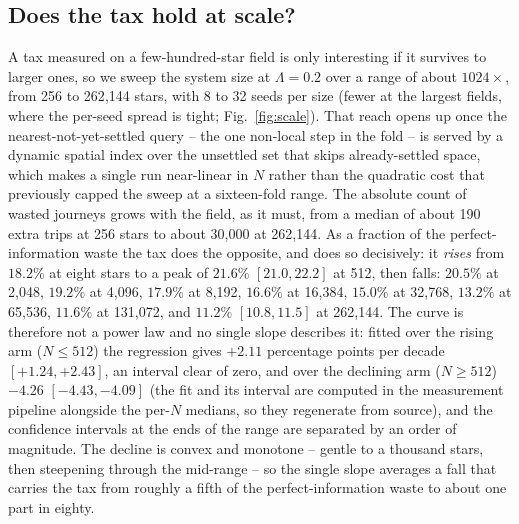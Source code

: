 \subsection{Does the tax hold at scale?}
\label{sec:scale}
A tax measured on a few-hundred-star field is only interesting if it survives to larger ones, so we
sweep the system size at $\Lambda = 0.2$ over a range of about $1024\times$, from 256 to 262{,}144
stars, with 8 to 32 seeds per size (fewer at the largest fields, where the per-seed spread is tight;
Fig.~\ref{fig:scale}). That reach opens up once the nearest-not-yet-settled query -- the one non-local step in the fold -- is served by
a dynamic spatial index over the unsettled set that skips already-settled space, which makes a single
run near-linear in $N$ rather than the quadratic cost that previously capped the sweep at a
sixteen-fold range. The absolute count of wasted journeys grows with the field, as it must, from a
median of about 190 extra trips at 256 stars to about 30{,}000 at 262{,}144. As a fraction of the
perfect-information waste the tax does the opposite, and does so decisively: it \emph{rises} from $18.2\%$ at eight
stars to a peak of $21.6\%$ $[21.0, 22.2]$ at 512, then falls: $20.5\%$ at 2{,}048, $19.2\%$ at
4{,}096, $17.9\%$ at 8{,}192, $16.6\%$ at 16{,}384, $15.0\%$ at 32{,}768, $13.2\%$ at 65{,}536,
$11.6\%$ at 131{,}072, and $11.2\%$ $[10.8, 11.5]$ at 262{,}144. The curve is therefore not a power
law and no single slope describes it: fitted over the rising arm ($N \leq 512$) the regression gives
$+2.11$ percentage points per decade $[+1.24, +2.43]$, an interval clear of zero, and over the
declining arm ($N \geq 512$) $-4.26$ $[-4.43, -4.09]$ (the fit and its
interval are computed in the measurement pipeline alongside the per-$N$ medians, so they regenerate
from source), and the confidence intervals at the ends of the range are separated by an order of
magnitude. The decline is convex and monotone -- gentle to a thousand stars, then steepening through
the mid-range -- so the single slope averages a fall that carries the tax
from roughly a fifth of the perfect-information waste to about one part in eighty.

